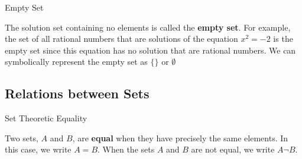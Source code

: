 \begin{definition}
Empty Set \\
\begin{tcolorbox}
    The solution set containing no elements is called the {\bf empty set}. For example, the set of all rational numbers that are solutions of the equation $x^2=-2$ is the empty set since this equation has no solution that are rational numbers. We can symbolically represent the empty set as $\{ \}$ or $\emptyset$ \\
\end{tcolorbox}
\end{definition}



\subsection{Relations between Sets}

\begin{definition}
Set Theoretic Equality \\
\begin{tcolorbox}
    Two sets, $A$ and $B$, are {\bf equal} when they have precisely the same elements. In this case, we write $A = B$. When the sets $A$ and $B$ are not equal, we write $A \neg B$. 
\end{tcolorbox}
\end{definition}


